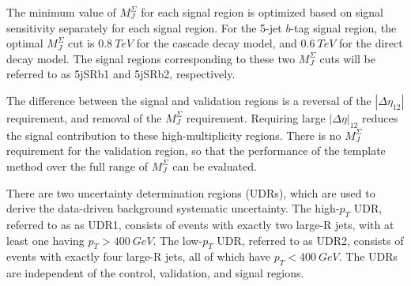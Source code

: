 The minimum value of $M_{J}^{\Sigma}$ for each signal region is optimized based on signal sensitivity separately for each signal region.
For the 5-jet $b$-tag signal region, the optimal $M_{J}^{\Sigma}$ cut is $0.8~TeV$ for the cascade decay model, and $0.6~TeV$ for the direct decay model.
The signal regions corresponding to these two $M_{J}^{\Sigma}$ cuts will be referred to as 5jSRb1 and 5jSRb2, respectively.

The difference between the signal and validation regions is a reversal of the $|\Delta\eta_{12}|$ requirement, and removal of the $M_{J}^{\Sigma}$ requirement.
Requiring large $|\Delta\eta|_{12}$ reduces the signal contribution to these high-multiplicity regions.
There is no $M_{J}^{\Sigma}$ requirement for the validation region, so that the performance of the template method over the full range of $M_{J}^{\Sigma}$ can be evaluated.

There are two uncertainty determination regions (UDRs), which are used to derive the data-driven background systematic uncertainty.
The high-$p_{T}$ UDR, referred to as as UDR1, consists of events with exactly two large-R jets, with at least one having $p_{T}>400~GeV$.
The low-$p_{T}$ UDR, referred to as UDR2, consists of events with exactly four large-R jets, all of which have $p_{T}<400~GeV$.
The UDRs are independent of the control, validation, and signal regions.

